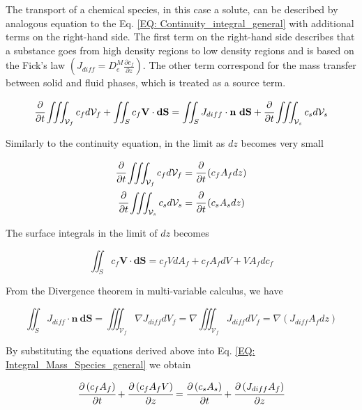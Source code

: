 \documentclass[../Article_Model_Parameters.tex]{subfiles}
\begin{document}
	The transport of a chemical species, in this case a solute, can be described by analogous equation to the Eq. \ref{EQ: Continuity_integral_general} with additional terms on the right-hand side. The first term on the right-hand side describes that a substance goes from high density regions to low density regions and is based on the Fick's law $\left( J_{diff} = D_e^M\frac{\partial c_f}{\partial z} \right)$. The other term correspond for the mass transfer between solid and fluid phases, which is treated as a source term.
	
	{\footnotesize
		\begin{equation}
			\cfrac{\partial}{\partial t} \iiint_{\mathcal{V}_f} c_f d\mathcal{V}_f + \iint_S c_f \textbf{V} \cdot \textbf{dS} = \iint_S J_{diff} \cdot \textbf{n}~\textbf{dS} + \cfrac{\partial}{\partial t} \iiint_{\mathcal{V}_s} c_s d\mathcal{V}_s
			\label{EQ: Integral_Mass_Species_general}
		\end{equation}
	}
	
	Similarly to the continuity equation, in the limit as $dz$ becomes very small
	
	{\footnotesize
		\begin{align}
			\cfrac{\partial}{\partial t} \iiint_{\mathcal{V}_f} c_f d\mathcal{V}_f &= \cfrac{\partial}{\partial t}\left( c_f A_f dz \right) \\
			\cfrac{\partial}{\partial t} \iiint_{\mathcal{V}_s} c_s d\mathcal{V}_s &= \cfrac{\partial}{\partial t}\left( c_s A_s dz \right)
		\end{align}
	}

	The surface integrals in the limit of $dz$ becomes
	
	{\footnotesize
		\begin{equation}
			\iint_S c_f \textbf{V} \cdot \textbf{dS} = c_f V dA_f + c_f A_f dV + V A_f dc_f 
		\end{equation}
	}
	
	From the Divergence theorem in multi-variable calculus, we have
	
	{\footnotesize
		\begin{equation}
			\iint_S J_{diff} \cdot \textbf{n}~\textbf{dS} = \iiint_{\mathcal{V}_f} \nabla J_{diff} dV_f = \nabla \iiint_{\mathcal{V}_f} J_{diff} dV_f = \nabla \left( J_{diff} A_f dz \right)
		\end{equation}
	}
	
	By substituting the equations derived above into Eq. \ref{EQ: Integral_Mass_Species_general} we obtain
	
	{\footnotesize
		\begin{equation}
			\cfrac{\partial \left( c_f A_f \right)}{\partial t} + \cfrac{\partial \left( c_f A_f V \right)}{\partial z} = \cfrac{\partial \left( c_s A_s \right) }{\partial t} + \cfrac{\partial \left( J_{diff} A_f \right) }{\partial z}
		\end{equation}
	}
\end{document}
